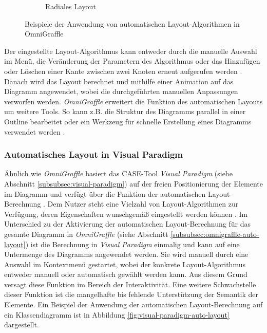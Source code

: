 \begin{figure}[hbt]
\begin{subfigure}{\subfigureshortwidth}
        \caption{Radiales Layout}
        \label{fig:omnigraffle-automatic-layout-f}
    \end{subfigure}
    \caption{Beispiele der Anwendung von automatischen Layout-Algorithmen in OmniGraffle}
    \label{fig:omnigraffle-automatic-layout}
\end{figure}

Der eingestellte Layout-Algorithmus kann entweder durch die manuelle Auswahl im Menü, die Veränderung der Parametern des Algorithmus oder das Hinzufügen oder Löschen einer Kante zwischen zwei Knoten erneut aufgerufen werden \cite[S.43]{Wybrow08Using}. Danach wird das Layout berechnet und mithilfe einer Animation auf das Diagramm angewendet, wobei die durchgeführten manuellen Anpassungen verworfen werden. \textit{OmniGraffle} erweitert die Funktion des automatischen Layouts um weitere Tools. So kann z.B. die Struktur des Diagramms parallel in einer Outline bearbeitet oder ein Werkzeug für schnelle Erstellung eines Diagramms verwendet werden \cite{08OmniGraffle}.

\subsubsection{Automatisches Layout in Visual Paradigm}

Ähnlich wie \textit{OmniGraffle} basiert das CASE-Tool \textit{Visual Paradigm} (siehe Abschnitt \ref{subsubsec:visual-paradigm}) auf der freien Positionierung der Elemente im Diagramm und verfügt über die Funktion der automatischen Layout-Berechnung \cite{14Visual}. Dem Nutzer steht eine Vielzahl von Layout-Algorithmen zur Verfügung, deren Eigenschaften wunschgemäß eingestellt werden können \cite{Fuhrmann11On-the-Pragmatics}. Im Unterschied zu der Aktivierung der automatischen Layout-Berechnung für das gesamte Diagramm in \textit{OmniGraffle} (siehe Abschnitt \ref{subsubsec:omnigraffle-auto-layout}) ist die Berechnung in \textit{Visual Paradigm} einmalig und kann auf eine Untermenge des Diagramms angewendet werden. Sie wird manuell durch eine Auswahl im Kontextmenü gestartet, wobei der konkrete Layout-Algorithmus entweder manuell oder automatisch gewählt werden kann. Aus diesem Grund versagt diese Funktion im Bereich der Interaktivität. Eine weitere Schwachstelle dieser Funktion ist die mangelhafte bis fehlende Unterstützung der Semantik der Elemente. Ein Beispiel der Anwendung der automatischen Layout-Berechnung auf ein Klassendiagramm ist in Abbildung \ref{fig:visual-paradigm-auto-layout} dargestellt.


